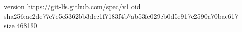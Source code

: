 version https://git-lfs.github.com/spec/v1
oid sha256:ae2de77e7e5e5362bb3dcc1f7183f4b7ab53fe029cb0d5e917c2590a70bae617
size 468180
